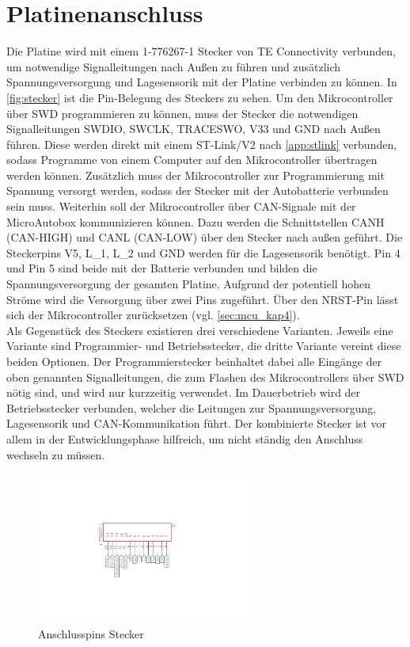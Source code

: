 \section{Platinenanschluss}\label{sec:stecker}
Die Platine wird mit einem 1-776267-1 Stecker von TE Connectivity verbunden, um notwendige Signalleitungen nach Außen zu führen und zusätzlich Spannungsversorgung und Lagesensorik mit der Platine verbinden zu können. In \autoref{fig:stecker} ist die Pin-Belegung des Steckers zu sehen. Um den Mikrocontroller über SWD programmieren zu können, muss der Stecker die notwendigen Signalleitungen SWDIO, SWCLK, TRACESWO, V33 und GND nach Außen führen. Diese werden direkt mit einem ST-Link/V2 nach \autoref{app:stlink} verbunden, sodass Programme von einem Computer auf den Mikrocontroller übertragen werden können. Zusätzlich muss der Mikrocontroller zur Programmierung mit Spannung versorgt werden, sodass der Stecker mit der Autobatterie verbunden sein muss. Weiterhin soll der Mikrocontroller über CAN-Signale mit der MicroAutobox kommunizieren können. Dazu werden die Schnittstellen CANH (CAN-HIGH) und CANL (CAN-LOW) über den Stecker nach außen geführt. Die Steckerpins V5, L\_1, L\_2 und GND werden für die Lagesensorik benötigt. Pin 4 und Pin 5 sind beide mit der Batterie verbunden und bilden die Spannungsversorgung der gesamten Platine. Aufgrund der potentiell hohen Ströme wird die Versorgung über zwei Pins zugeführt. Über den NRST-Pin lässt sich der Mikrocontroller zurücksetzen (vgl. \autoref{sec:mcu_kap4}).\\ Als Gegenstück des Steckers existieren drei verschiedene Varianten. Jeweils eine Variante sind Programmier- und Betriebsstecker, die dritte Variante vereint diese beiden Optionen. Der Programmierstecker beinhaltet dabei alle Eingänge der oben genannten Signalleitungen, die zum Flashen des Mikrocontrollers über SWD nötig sind, und wird nur kurzzeitig verwendet. Im Dauerbetrieb wird der Betriebsstecker verbunden, welcher die Leitungen zur Spannungsversorgung, Lagesensorik und CAN-Kommunikation führt. Der kombinierte Stecker ist vor allem in der Entwicklungsphase hilfreich, um nicht ständig den Anschluss wechseln zu müssen. 


\begin{figure}[H]%
\centering
\includegraphics[width=200pt]{./Bilder/stecker.pdf}%
\caption{Anschlusspins Stecker}%
\label{fig:stecker}%
\end{figure}

